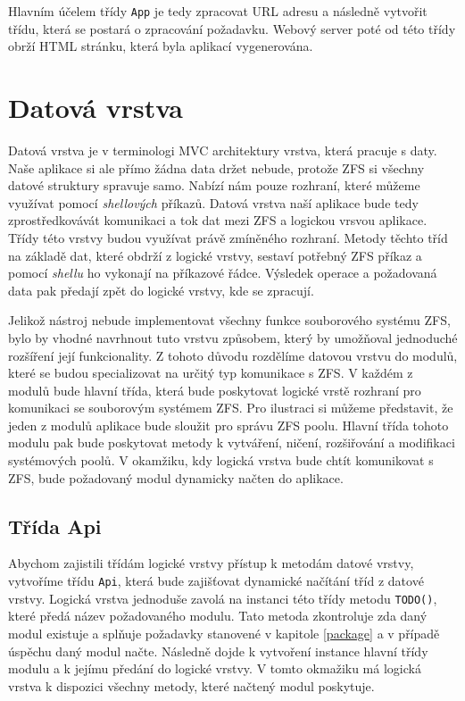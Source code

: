     Hlavním účelem třídy \verb|App| je tedy zpracovat URL adresu a následně vytvořit třídu, která se postará o zpracování požadavku. Webový server poté od této třídy obrží HTML stránku, která byla aplikací vygenerována.

\section{Datová vrstva}
Datová vrstva je v terminologi MVC architektury vrstva, která pracuje s daty. Naše aplikace si ale přímo žádna data držet nebude, protože ZFS si všechny datové struktury spravuje samo. Nabízí nám pouze rozhraní, které můžeme využívat pomocí \emph{shellových} příkazů. Datová vrstva naší aplikace bude tedy zprostředkovávát komunikaci a tok dat mezi ZFS a logickou vrsvou aplikace. Třídy této vrstvy budou využívat právě zmíněného rozhraní. Metody těchto tříd na základě dat, které obdrží z logické vrstvy, sestaví potřebný ZFS příkaz a pomocí \emph{shellu} ho vykonají na příkazové řádce. Výsledek operace a požadovaná data pak předají zpět do logické vrstvy, kde se zpracují.

Jelikož nástroj nebude implementovat všechny funkce souborového systému ZFS, bylo by vhodné navrhnout tuto vrstvu způsobem, který by umožňoval jednoduché rozšíření její funkcionality.
Z tohoto důvodu rozdělíme datovou vrstvu do modulů, které se budou specializovat na určitý typ komunikace s ZFS. V každém z modulů bude hlavní třída, která bude poskytovat logické vrstě rozhraní pro komunikaci se souborovým systémem ZFS. Pro ilustraci si můžeme představit, že jeden z modulů aplikace bude sloužit pro správu ZFS poolu. Hlavní třída tohoto modulu pak bude poskytovat metody k vytváření, ničení, rozšiřování a modifikaci systémových poolů. V okamžiku, kdy logická vrstva bude chtít komunikovat s ZFS, bude požadovaný modul dynamicky načten do aplikace.
    \subsection{Třída Api}
    Abychom zajistili třídám logické vrstvy přístup k metodám datové vrstvy, vytvoříme třídu \verb|Api|, která bude zajišťovat dynamické načítání tříd z datové vrstvy. Logická vrstva jednoduše zavolá na instanci této třídy metodu \verb|TODO()|, které předá název požadovaného modulu. Tato metoda zkontroluje zda daný modul existuje a splňuje požadavky stanovené v kapitole \ref{package} a v případě úspěchu daný modul načte. Následně dojde k vytvoření instance hlavní třídy modulu a k jejímu předání do logické vrstvy. V tomto okmažiku má logická vrstva k dispozici všechny metody, které načtený modul poskytuje.

